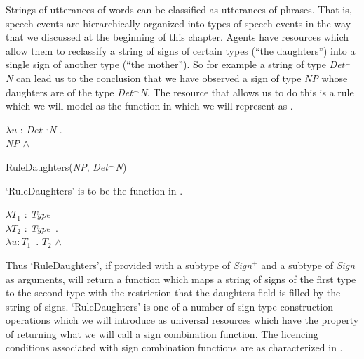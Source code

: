 Strings of utterances of words can be classified as utterances of
phrases.  That is, speech events are hierarchically organized into
types of speech events in the way that we discussed at the beginning
of this chapter.  Agents have resources which allow them to reclassify
a string of signs of certain types (``the daughters'') into a single
sign of another type (``the mother'').  So for example a string of
type \textit{Det}$^{\frown}$\textit{N} can lead us to the conclusion
that we have observed a sign of type \textit{NP} whose daughters are
of the type \textit{Det}$^{\frown}$\textit{N}.  The resource that
allows us to do this is a rule which we will
model as the function in  which we will represent as .
\begin{ex}
\begin{subex} 
\item $\lambda u$ : \textit{Det}$^{\frown}$\textit{N} . \\
\hspace*{1em}\textit{NP} \d{$\wedge$}

\item RuleDaughters(\textit{NP}, \textit{Det}$^{\frown}$\textit{N})
\end{subex}
\label{ex:NPDetNDaughters}
\end{ex}
`RuleDaughters' is to be the function in \nexteg{}.
\begin{ex} 
$\lambda T_1$ : \textit{Type} \\
\hspace*{1em} $\lambda T_2$ : \textit{Type}\ . \\
\hspace*{2em} $\lambda u : T_1$\ . $T_2$ \d{$\wedge$}  
\end{ex} 
Thus `RuleDaughters', if provided with a subtype of \textit{Sign}$^+$
and a subtype of \textit{Sign} as arguments, will return a function which 
maps a string of signs of the first type to the second type with the
restriction that the daughters field is filled by the string of
signs. `RuleDaughters' is one of a number of sign type construction
operations which we will introduce as universal resources which have
the property of returning what we will call a sign combination function.  The licencing conditions
associated with sign combination functions are as characterized in
\nexteg{}.

